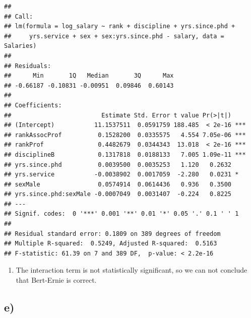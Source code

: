 \documentclass[
]{article}
\newenvironment{Shaded}{\begin{snugshade}}{\end{snugshade}}
\newcommand{\AttributeTok}[1]{\textcolor[rgb]{0.77,0.63,0.00}{#1}}
\newcommand{\CommentTok}[1]{\textcolor[rgb]{0.56,0.35,0.01}{\textit{#1}}}
\newcommand{\ControlFlowTok}[1]{\textcolor[rgb]{0.13,0.29,0.53}{\textbf{#1}}}
\newcommand{\DecValTok}[1]{\textcolor[rgb]{0.00,0.00,0.81}{#1}}
\newcommand{\FunctionTok}[1]{\textcolor[rgb]{0.00,0.00,0.00}{#1}}
\newcommand{\NormalTok}[1]{#1}
\newcommand{\OtherTok}[1]{\textcolor[rgb]{0.56,0.35,0.01}{#1}}
\newcommand{\SpecialCharTok}[1]{\textcolor[rgb]{0.00,0.00,0.00}{#1}}
\providecommand{\tightlist}{%
  \setlength{\itemsep}{0pt}\setlength{\parskip}{0pt}}
\begin{document}
\begin{verbatim}
## 
## Call:
## lm(formula = log_salary ~ rank + discipline + yrs.since.phd + 
##     yrs.service + sex + sex:yrs.since.phd - salary, data = Salaries)
## 
## Residuals:
##      Min       1Q   Median       3Q      Max 
## -0.66187 -0.10831 -0.00951  0.09846  0.60143 
## 
## Coefficients:
##                         Estimate Std. Error t value Pr(>|t|)    
## (Intercept)           11.1537511  0.0591759 188.485  < 2e-16 ***
## rankAssocProf          0.1528200  0.0335575   4.554 7.05e-06 ***
## rankProf               0.4482679  0.0344343  13.018  < 2e-16 ***
## disciplineB            0.1317818  0.0188133   7.005 1.09e-11 ***
## yrs.since.phd          0.0039500  0.0035253   1.120   0.2632    
## yrs.service           -0.0038902  0.0017059  -2.280   0.0231 *  
## sexMale                0.0574914  0.0614436   0.936   0.3500    
## yrs.since.phd:sexMale -0.0007049  0.0031407  -0.224   0.8225    
## ---
## Signif. codes:  0 '***' 0.001 '**' 0.01 '*' 0.05 '.' 0.1 ' ' 1
## 
## Residual standard error: 0.1809 on 389 degrees of freedom
## Multiple R-squared:  0.5249, Adjusted R-squared:  0.5163 
## F-statistic: 61.39 on 7 and 389 DF,  p-value: < 2.2e-16
\end{verbatim}

\begin{enumerate}
\def\labelenumi{\roman{enumi})}
\setcounter{enumi}{1}
\tightlist
\item
  The interaction term is not statistically significant, so we can not
  conclude that Bert-Ernie is correct.
\end{enumerate}

\hypertarget{e-1}{%
\subsection{e)}\label{e-1}}

\begin{Shaded}
\end{Shaded}
\end{document}
